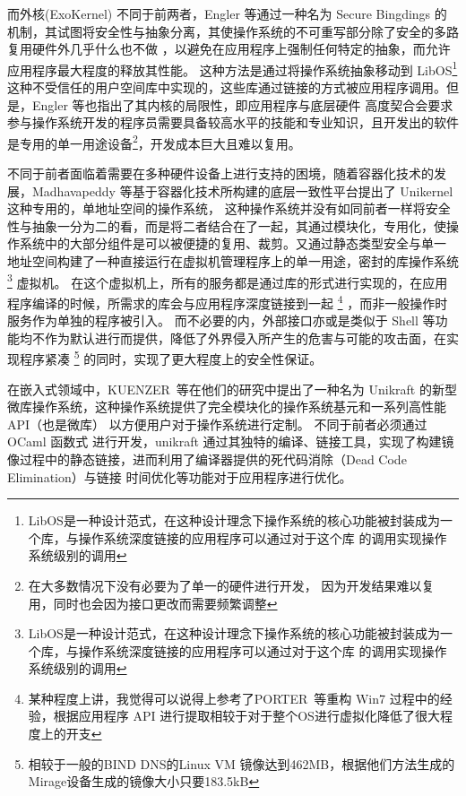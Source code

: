     而外核(ExoKernel) 不同于前两者，Engler 等通过一种名为 Secure Bingdings 的机制，其试图将安全性与抽象分离，其使操作系统的不可重写部分除了安全的多路复用硬件外几乎什么也不做
    ，以避免在应用程序上强制任何特定的抽象，而允许应用程序最大程度的释放其性能。
    这种方法是通过将操作系统抽象移动到 LibOS\footnote{LibOS是一种设计范式，在这种设计理念下操作系统的核心功能被封装成为一个库，与操作系统深度链接的应用程序可以通过对于这个库
    的调用实现操作系统级别的调用}
     这种不受信任的用户空间库中实现的，这些库通过链接的方式被应用程序调用。但是，Engler 等也指出了其内核的局限性，即应用程序与底层硬件
    高度契合会要求参与操作系统开发的程序员需要具备较高水平的技能和专业知识，且开发出的软件是专用的单一用途设备\footnote{在大多数情况下没有必要为了单一的硬件进行开发，
    因为开发结果难以复用，同时也会因为接口更改而需要频繁调整}，开发成本巨大且难以复用。
    \cite{wikiosdev_exokernel, engler_exokernel_1998}

    不同于前者面临着需要在多种硬件设备上进行支持的困境，随着容器化技术的发展，Madhavapeddy 等基于容器化技术所构建的底层一致性平台提出了 Unikernel 这种专用的，单地址空间的操作系统，
    这种操作系统并没有如同前者一样将安全性与抽象一分为二的看，而是将二者结合在了一起，其通过模块化，专用化，使操作系统中的大部分组件是可以被便捷的复用、裁剪。又通过静态类型安全与单一
    地址空间构建了一种直接运行在虚拟机管理程序上的单一用途，密封的库操作系统\footnote{LibOS是一种设计范式，在这种设计理念下操作系统的核心功能被封装成为一个库，与操作系统深度链接的应用程序可以通过对于这个库
    的调用实现操作系统级别的调用} 虚拟机。
    在这个虚拟机上，所有的服务都是通过库的形式进行实现的，在应用程序编译的时候，所需求的库会与应用程序深度链接到一起
    \footnote{某种程度上讲，我觉得可以说得上参考了PORTER 等重构 Win7 过程中的经验，根据应用程序 API 进行提取相较于对于整个OS进行虚拟化降低了很大程度上的开支\cite{porter2011rethinking}}
    ，而非一般操作时服务作为单独的程序被引入。
    而不必要的内，外部接口亦或是类似于 Shell 等功能均不作为默认进行而提供，降低了外界侵入所产生的危害与可能的攻击面，在实现程序紧凑
    \footnote{相较于一般的BIND DNS的Linux VM 镜像达到462MB，根据他们方法生成的Mirage设备生成的镜像大小只要183.5kB}
    的同时，实现了更大程度上的安全性保证。\cite{madhavapeddy_unikernels_nodate}

    在嵌入式领域中，KUENZER 等在他们的研究中提出了一种名为 Unikraft 的新型微库操作系统，这种操作系统提供了完全模块化的操作系统基元和一系列高性能 API（也是微库） 以方便用户对于操作系统进行定制。
    不同于前者必须通过 OCaml 函数式 进行开发，unikraft 通过其独特的编译、链接工具，实现了构建镜像过程中的静态链接，进而利用了编译器提供的死代码消除（Dead Code Elimination）与链接
    时间优化等功能对于应用程序进行优化。
    \cite{kuenzer_unikraft_2021}


